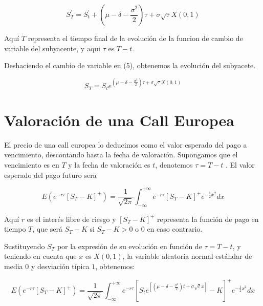 \documentclass[12pt]{article}
\begin{document}
\begin{equation}
	S_{T}^{'} = S_{t}^{'} + \left(\mu - \delta - \frac{\sigma^{2}}{2}\right) \tau + \sigma\sqrt{\tau}X(0,1)
\end{equation}

Aqu\'{i} $T$ representa el tiempo final de la evoluci\'{o}n de la funcion de cambio de variable del subyacente, y aqui $\tau$ es 
$T - t$.
\newline

Deshaciendo el cambio de variable en (5), obtenemos la evoluci\'{o}n del subyacete.
\newline

\begin{equation}
	S_{T}=S_{t}e^{\left( \mu - \delta - \frac{\sigma^{2}}{2} \right)\tau + \sigma\sqrt{\tau}X\left( 0,1\right)}
\end{equation}
\newpage

\section{Valoraci\'{o}n de una Call Europea}
El precio de una call europea lo deducimos como el valor esperado del pago a vencimiento, descontando hasta
la fecha de valoraci\'{o}n. Supongamos que el vencimiento es en $T$ y la fecha de valoraci\'{o}n es $t$, denotemos $\tau = T - t$ . 
El valor esperado del pago futuro sera

\begin{equation}
	E\left( e^{-r\tau} \left[ S_{T} - K \right] ^{+} \right) = \frac{1}{\sqrt{2\pi}} \int_{-\infty}^{+\infty}e^{-r\tau}
	\left[ S_{T} - K \right] ^{+} e^{-\frac{1}{2}x^{2}}dx
\end{equation}
\newline

Aqu\'{i} $r$ es el inter\'{e}s libre de riesgo y $\left[S_{T}-K\right] ^{+}$ representa la funci\'{o}n de pago en tiempo $T$, que ser\'{a} $S_{T}-K$
si $S_{T}-K>0$ o $0$ en caso contrario.
\newline

Sustituyendo $S_{T}$ por la expresi\'{o}n de su evoluci\'{o}n en funci\'{o}n de $\tau = T - t$, y teniendo en cuenta que $x$ es $X\left(0,1
\right)$, la variable aleatoria normal est\'{a}ndar de media $0$ y desviaci\'{o}n t\'{i}pica $1$, obtenemos:
\newline

\begin{equation}
	E\left( e^{-r\tau} \left[ S_{T} - K \right] ^{+} \right) = \frac{1}{\sqrt{2\pi}}\int_{-\infty}^{+\infty}e^{-r\tau}
	\left[S_{t}e^{\left[\left(\mu-\delta-\frac{\sigma^{2}}{2}\right)t+\sigma\sqrt{t}x\right]}-K\right]^{+}e^{-\frac{1}{2}x^{2}}
	dx	
\end{equation}
\newline
\end{document}
